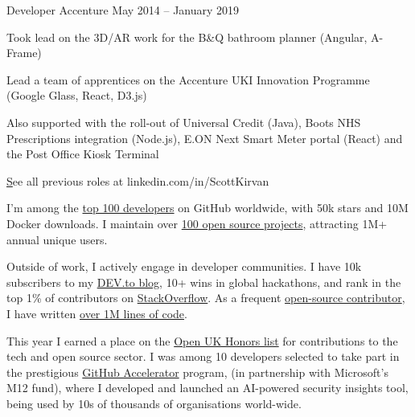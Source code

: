 \documentclass[]{resume-format}
\begin{document}
\begin{cventries}
    { Developer }
    { Accenture }
    {}
    { May 2014 – January 2019 }
    {\begin{cvitems}
        \item { Took lead on the 3D/AR work for the B\&Q bathroom planner (Angular, A-Frame) }
        \item { Lead a team of apprentices on the Accenture UKI Innovation Programme (Google Glass, React, D3.js) }
        \item { Also supported with the roll-out of Universal Credit (Java), Boots NHS Prescriptions integration (Node.js), E.ON Next Smart Meter portal (React) and the Post Office Kiosk Terminal }
    \end{cvitems}}
\end{cventries}

    \vspace{-5mm}
    \begin{flushright}
        \small\color{lightgray} \href{ https://linkedin.com/in/ScottKirvan }See all previous roles at linkedin.com/in/ScottKirvan
    \end{flushright}




\begin{cvachievements}
    \item { I'm among the \href{https://gitstar-ranking.com/Lissy93}{top 100 developers} on GitHub worldwide, with 50k stars and 10M Docker downloads. I maintain over \href{https://apps.aliciasykes.com/}{100 open source projects}, attracting 1M+ annual unique users. }
    \item { Outside of work, I actively engage in developer communities. I have 10k subscribers to my \href{https://dev.to/lissy93}{DEV.to blog}, 10+ wins in global hackathons, and rank in the top 1\% of contributors on \href{https://stackoverflow.com/users/979052/alicia-sykes}{StackOverflow}. As a frequent \href{https://github.com/lissy93}{open-source contributor}, I have written \href{https://codestats.net/users/alicia}{over 1M lines of code}. }
    \item { This year I earned a place on the \href{https://openuk.uk/community/openuk-honours-lists/2024-honours-list/}{Open UK Honors list} for contributions to the tech and open source sector. I was among 10 developers selected to take part in the prestigious \href{https://github.blog/news-insights/company-news/2024-github-accelerator-meet-the-11-projects-shaping-open-source-ai/#web-check-bringing-security-to-the-web}{GitHub Accelerator} program, (in partnership with Microsoft's M12 fund), where I developed and launched an AI-powered security insights tool, being used by 10s of thousands of organisations world-wide. }
\end{cvachievements}
\end{document}
